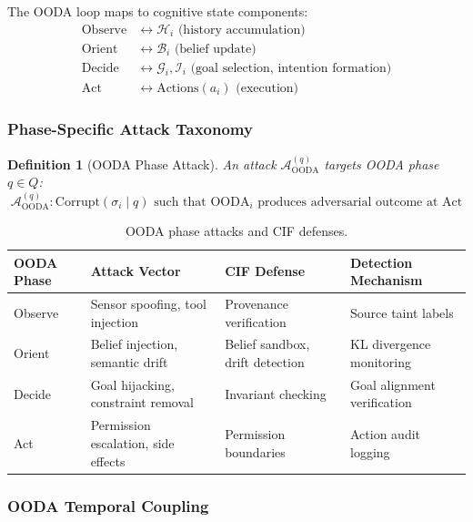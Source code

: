 \documentclass[
]{article}
\newtheorem{definition}{Definition}[section]
\begin{document}
The OODA loop maps to cognitive state components: \begin{align}
\label{eq:ooda-mapping}
\text{Observe} &\leftrightarrow \mathcal{H}_i \text{ (history accumulation)} \\
\text{Orient} &\leftrightarrow \mathcal{B}_i \text{ (belief update)} \\
\text{Decide} &\leftrightarrow \mathcal{G}_i, \mathcal{I}_i \text{ (goal selection, intention formation)} \\
\text{Act} &\leftrightarrow \text{Actions}(a_i) \text{ (execution)}
\end{align}

\subsubsection{Phase-Specific Attack
Taxonomy}\label{phase-specific-attack-taxonomy}

\begin{definition}[OODA Phase Attack]
\label{def:ooda-phase-attack}
An attack $\mathcal{A}_{\text{OODA}}^{(q)}$ targets OODA phase $q \in Q$:
\begin{equation}
\label{eq:ooda-attack}
\mathcal{A}_{\text{OODA}}^{(q)}: \text{Corrupt}(\sigma_i \mid q) \text{ such that } \text{OODA}_i \text{ produces adversarial outcome at } \text{Act}
\end{equation}
\end{definition}

\begin{table}[htbp]
\centering
\caption{OODA phase attacks and CIF defenses.}
\label{tab:ooda-attacks}
\begin{tabular}{@{}lp{4cm}p{4cm}l@{}}
\toprule
OODA Phase & Attack Vector & CIF Defense & Detection Mechanism \\
\midrule
Observe & Sensor spoofing, tool injection & Provenance verification & Source taint labels \\
Orient & Belief injection, semantic drift & Belief sandbox, drift detection & KL divergence monitoring \\
Decide & Goal hijacking, constraint removal & Invariant checking & Goal alignment verification \\
Act & Permission escalation, side effects & Permission boundaries & Action audit logging \\
\bottomrule
\end{tabular}
\end{table}

\subsubsection{OODA Temporal Coupling}\label{ooda-temporal-coupling}
\end{document}
